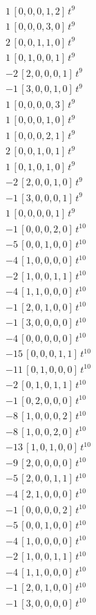 \begin{align*}
1\,[0,0,0,1,2]\,t^{9} \\
1\,[0,0,0,3,0]\,t^{9} \\
2\,[0,0,1,1,0]\,t^{9} \\
1\,[0,1,0,0,1]\,t^{9} \\
-2\,[2,0,0,0,1]\,t^{9} \\
-1\,[3,0,0,1,0]\,t^{9} \\
1\,[0,0,0,0,3]\,t^{9} \\
1\,[0,0,0,1,0]\,t^{9} \\
1\,[0,0,0,2,1]\,t^{9} \\
2\,[0,0,1,0,1]\,t^{9} \\
1\,[0,1,0,1,0]\,t^{9} \\
-2\,[2,0,0,1,0]\,t^{9} \\
-1\,[3,0,0,0,1]\,t^{9} \\
1\,[0,0,0,0,1]\,t^{9} \\
-1\,[0,0,0,2,0]\,t^{10} \\
-5\,[0,0,1,0,0]\,t^{10} \\
-4\,[1,0,0,0,0]\,t^{10} \\
-2\,[1,0,0,1,1]\,t^{10} \\
-4\,[1,1,0,0,0]\,t^{10} \\
-1\,[2,0,1,0,0]\,t^{10} \\
-1\,[3,0,0,0,0]\,t^{10} \\
-4\,[0,0,0,0,0]\,t^{10} \\
-15\,[0,0,0,1,1]\,t^{10} \\
-11\,[0,1,0,0,0]\,t^{10} \\
-2\,[0,1,0,1,1]\,t^{10} \\
-1\,[0,2,0,0,0]\,t^{10} \\
-8\,[1,0,0,0,2]\,t^{10} \\
-8\,[1,0,0,2,0]\,t^{10} \\
-13\,[1,0,1,0,0]\,t^{10} \\
-9\,[2,0,0,0,0]\,t^{10} \\
-5\,[2,0,0,1,1]\,t^{10} \\
-4\,[2,1,0,0,0]\,t^{10} \\
-1\,[0,0,0,0,2]\,t^{10} \\
-5\,[0,0,1,0,0]\,t^{10} \\
-4\,[1,0,0,0,0]\,t^{10} \\
-2\,[1,0,0,1,1]\,t^{10} \\
-4\,[1,1,0,0,0]\,t^{10} \\
-1\,[2,0,1,0,0]\,t^{10} \\
-1\,[3,0,0,0,0]\,t^{10}
\end{align*}
